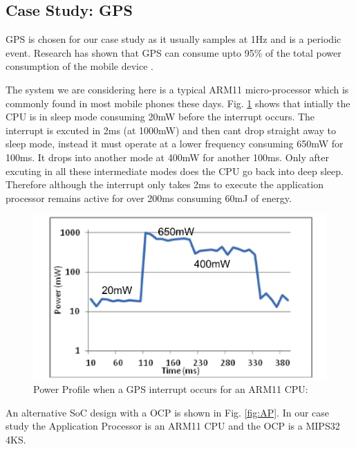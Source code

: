 \documentclass[conference]{IEEEtran}
\begin{document}
\subsection{Case Study: GPS}

GPS is chosen for our case study as it usually samples at 1Hz and is a periodic
event. Research has shown that GPS can consume upto 95\% of the total power
consumption of the mobile device \cite{b7}.

The system we are considering here is a typical ARM11 micro-processor which is
commonly found in most mobile phones these days. Fig. \ref{fig:Power_profile_ARM11} shows that intially the CPU is in sleep mode
consuming 20mW before the interrupt occurs. The interrupt is excuted in 2ms (at
1000mW) and then cant drop straight away to sleep mode, instead it must operate
at a lower frequency consuming 650mW for 100ms. It drops into another mode at
400mW for another 100ms. Only after excuting in all these intermediate modes
does the CPU go back into deep sleep. Therefore although the interrupt only
takes 2ms to execute the application processor remains active for over 200ms
consuming 60mJ of energy.

\begin{figure}[htbp]
	\includegraphics[width=\linewidth]{img/Pictures/Power_profile_ARM11.png}
	\centering
    \caption{Power Profile when a GPS interrupt occurs for an ARM11 CPU: \cite{b2}}
    \label{fig:Power_profile_ARM11}
\end{figure}

An alternative SoC design with a OCP is shown in Fig. \ref{fig:AP}. In our case study the Application Processor is an ARM11 CPU and the OCP is a MIPS32 4KS.
\end{document}
